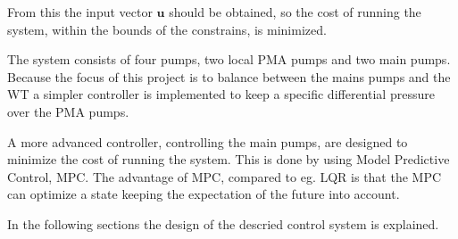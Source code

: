 From this the input vector $\pmb{u}$ should be obtained, so the cost of running the system, within the bounds of the constrains, is minimized. 


The system consists of four pumps, two local PMA pumps and two main pumps. Because the focus of this project is to balance between the mains pumps and the WT a simpler controller is implemented to keep a specific differential pressure over the PMA pumps.

A more advanced controller, controlling the main pumps, are designed to minimize the cost of running the system. This is done by using Model Predictive Control, MPC. The advantage of MPC, compared to eg. LQR is that the MPC can optimize a state keeping the expectation of the future into account. 

In the following sections the design of the descried control system is explained. 







